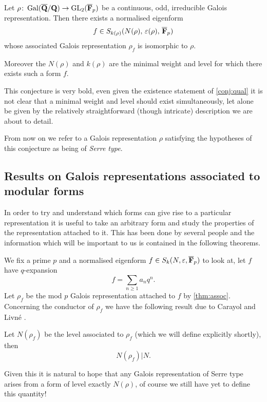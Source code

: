 \documentclass[a4paper,12pt]{article}
\begin{document}
\begin{conjecture}\label{conj:ref}
Let $\rho\colon \operatorname{Gal}(\overline{\mathbf{Q}}/\mathbf{Q}) \to \operatorname{GL}_2(\overline{\mathbf{F}}_p)$ be a continuous, odd, irreducible Galois representation.
Then there exists a normalised eigenform
\[
f\in S_{k(\rho)}(N(\rho),\,\varepsilon(\rho),\,\overline{\mathbf{F}}_p)
\]
whose associated Galois representation $\rho_f$ is isomorphic to $\rho$.

Moreover the $N(\rho)$ and $k(\rho)$ are the minimal weight and level for which there exists such a form $f$.
\end{conjecture}

This conjecture is very bold, even given the existence statement of \cref{conj:qual} it is not clear that a minimal weight and level should exist simultaneously, let alone be given by the relatively straightforward (though intricate) description we are about to detail.

From now on we refer to a Galois representation $\rho$ satisfying the hypotheses of this conjecture as being of \emph{Serre type}.


\subsection{Results on Galois representations associated to modular forms}
In order to try and understand which forms can give rise to a particular representation it is useful to take an arbitrary form and study the properties of the representation attached to it.
This has been done by several people and the information which will be important to us is contained in the following theorems. %

We fix a prime $p$ and a normalised eigenform $f \in S_k(N, \varepsilon, \overline{\mathbf{F}}_p)$ to look at, let $f$ have $q$-expansion %
\[
f = \sum_{n\ge 1} a_nq^n.
\]
Let $\rho_f$ be the mod $p$ Galois representation attached to $f$ by \cref{thm:assoc}.
Concerning the conductor of $\rho_f$ we have the following result due to Carayol and Livn\'e \cite{Carayol, Livne}.

\begin{thm}
Let $N(\rho_f)$ be the level associated to $\rho_f$ (which we will define explicitly shortly), then
\[
N(\rho_f)|N.
\]
\end{thm}

Given this it is natural to hope that any Galois representation of Serre type arises from a form of level exactly $N(\rho)$, of course we still have yet to define this quantity!
\end{document}
